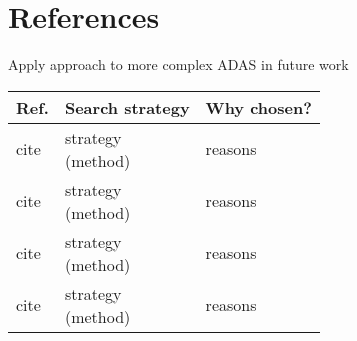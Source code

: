 \documentclass[oneside, notitlepage, twocolumn]{scrartcl}
\newcommand{\tableheadline}[1]{\textbf{#1}}
\newcommand{\draft}[1]{\textcolor{red}{\textit{#1}}}
\begin{document}
\section{References}
\begingroup
\renewcommand{\section}[2]{}%
\nocite{*}
\printbibliography%
\endgroup

\section{Related Work}
\draft{Apply approach to more complex ADAS in future work}
\begin{adjustbox}{angle=90}
\begin{tabularx}{\textwidth}{llX}
    \tableheadline{Ref.} & \tableheadline{Search strategy} & \tableheadline{Why chosen?}\\
    \midrule
    cite & \makecell{strategy\\(method)} & reasons\\
    \midrule
    cite & \makecell{strategy\\(method)} & reasons\\
    \midrule
    cite & \makecell{strategy\\(method)}& reasons\\
    \midrule
    cite & \makecell{strategy\\(method)}& reasons\\
\end{tabularx}
\end{adjustbox}
\end{document}
